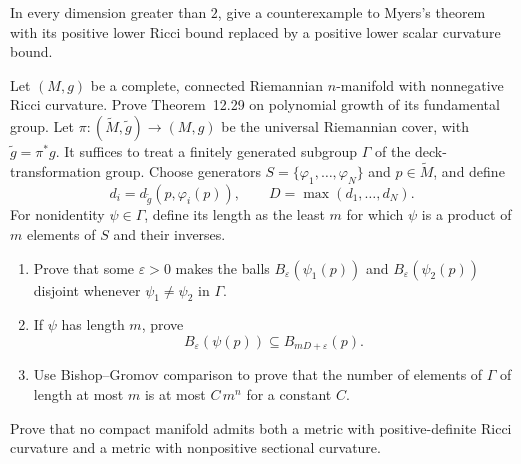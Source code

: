 \begin{exercise}
\label{prob:myers-scalar-counterexample}

In every dimension greater than $2$, give a counterexample to Myers's theorem
with its positive lower Ricci bound replaced by a positive lower scalar
curvature bound.
\end{exercise}

\begin{exercise}
\label{prob:milnor-fundamental-group}

Let $(M,g)$ be a complete, connected Riemannian $n$-manifold with
nonnegative Ricci curvature. Prove Theorem~12.29 on polynomial growth of its
fundamental group. Let
$\pi:(\widetilde M,\widetilde g)\to(M,g)$ be the universal Riemannian cover,
with $\widetilde g=\pi^*g$. It suffices to treat a finitely generated subgroup
$\Gamma$ of the deck-transformation group. Choose generators
$S=\{\varphi_1,\ldots,\varphi_N\}$ and $p\in\widetilde M$, and define
\[
d_i=d_{\widetilde g}(p,\varphi_i(p)),
\qquad
D=\max(d_1,\ldots,d_N).
\]
For nonidentity $\psi\in\Gamma$, define its length as the least $m$ for which
$\psi$ is a product of $m$ elements of $S$ and their inverses.
\begin{enumerate}[label=(\alph*)]
\item Prove that some $\varepsilon>0$ makes the balls
$B_\varepsilon(\psi_1(p))$ and $B_\varepsilon(\psi_2(p))$ disjoint whenever
$\psi_1\neq\psi_2$ in $\Gamma$.
\item If $\psi$ has length $m$, prove
\[
B_\varepsilon(\psi(p))\subseteq B_{mD+\varepsilon}(p).
\]
\item Use Bishop--Gromov comparison to prove that the number of elements of
$\Gamma$ of length at most $m$ is at most $C\,m^n$ for a constant $C$.
\end{enumerate}
\end{exercise}

\begin{exercise}
\label{prob:no-positive-negative-ricci}

Prove that no compact manifold admits both a metric with positive-definite
Ricci curvature and a metric with nonpositive sectional curvature.
\end{exercise}

